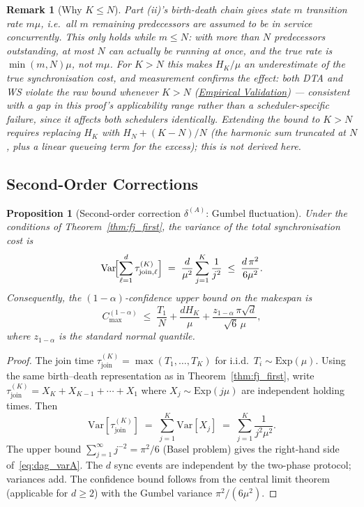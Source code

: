 \documentclass[11pt,a4paper]{report}
\newtheorem{proposition}[theorem]{Proposition}
\newtheorem{remark}{Remark}[section]
\begin{document}
\begin{remark}[Why $K \leq N$]
Part (ii)'s birth-death chain gives state $m$ transition rate $m\mu$,
i.e.\ all $m$ remaining predecessors are assumed to be in service
\emph{concurrently}. This only holds while $m \leq N$: with more than
$N$ predecessors outstanding, at most $N$ can actually be running at
once, and the true rate is $\min(m,N)\mu$, not $m\mu$. For $K > N$ this
makes $H_K/\mu$ an underestimate of the true synchronisation cost, and
measurement confirms the effect: both DTA and WS violate the raw bound
whenever $K > N$ (\hyperref[chap:empirical_validation]{Empirical
Validation}) --- consistent with a gap in this proof's applicability
range rather than a scheduler-specific failure, since it affects both
schedulers identically. Extending the bound to $K > N$ requires
replacing $H_K$ with $H_N + (K-N)/N$ (the harmonic sum truncated at
$N$, plus a linear queueing term for the excess); this is not derived
here.
\end{remark}

\subsection{Second-Order Corrections}

\begin{proposition}[Second-order correction $\delta^{(A)}$: Gumbel fluctuation]
\label{prop:dag_2A}
Under the conditions of Theorem~\ref{thm:fj_first}, the variance of
the total synchronisation cost is
\begin{equation}\label{eq:dag_varA}
  \mathrm{Var}\!\Bigl[\sum_{\ell=1}^d \tau_{\mathrm{join},\ell}^{(K)}\Bigr]
  \;=\;
  \frac{d}{\mu^2} \sum_{j=1}^K \frac{1}{j^2}
  \;\leq\;
  \frac{d\,\pi^2}{6\mu^2}.
\end{equation}
Consequently, the $(1-\alpha)$-confidence upper bound on the makespan is
\[
  C_{\max}^{(1-\alpha)}
  \;\leq\;
  \frac{T_1}{N} + \frac{d H_K}{\mu}
  + \frac{z_{1-\alpha}\,\pi\sqrt{d}}{\sqrt{6}\,\mu},
\]
where $z_{1-\alpha}$ is the standard normal quantile.
\end{proposition}

\begin{proof}
The join time $\tau_{\mathrm{join}}^{(K)} = \max(T_1,\ldots,T_K)$ for
i.i.d.\ $T_i \sim \mathrm{Exp}(\mu)$.
Using the same birth--death representation as in Theorem~\ref{thm:fj_first},
write $\tau_{\mathrm{join}}^{(K)} = X_K + X_{K-1} + \cdots + X_1$ where
$X_j \sim \mathrm{Exp}(j\mu)$ are independent holding times.
Then
\[
  \mathrm{Var}[\tau_{\mathrm{join}}^{(K)}]
  \;=\; \sum_{j=1}^K \mathrm{Var}[X_j]
  \;=\; \sum_{j=1}^K \frac{1}{j^2\mu^2}.
\]
The upper bound $\sum_{j=1}^\infty j^{-2} = \pi^2/6$ (Basel problem) gives
the right-hand side of~\eqref{eq:dag_varA}.
The $d$ sync events are independent by the two-phase protocol;
variances add.
The confidence bound follows from the central limit theorem
(applicable for $d \geq 2$) with the Gumbel variance $\pi^2/(6\mu^2)$.
\end{proof}
\end{document}
